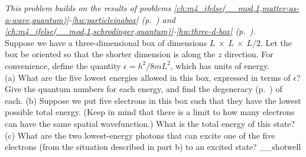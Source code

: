 \emph{This problem builds on the results of problems \ref{ch:m4_ifelse(__mod,1,matter-as-a-wave,quantum)}-\ref{hw:particleinabox}
(p.~\pageref{hw:particleinabox}) and \ref{ch:m4_ifelse(__mod,1,schrodinger,quantum)}-\ref{hw:three-d-box}
(p.~\pageref{hw:three-d-box}).}\\
Suppose we have a three-dimensional box of dimensions $L\ \times\ L\ \times\ L/2$.
Let the box be oriented so that the shorter dimension is along the $z$ direction.
For convenience, define the quantity $\epsilon=h^2/8mL^2$, which has units of energy.\\
(a) What are the five lowest energies allowed in this box, expressed in terms of
$\epsilon$? Give the quantum numbers for each energy,
and find the degeneracy (p.~\pageref{m4_ifelse(__mod,1,quantum-degeneracy,subsubsec:degeneracy)}) of each.\hwendpart
(b) Suppose we put five electrons in this box such that they have the lowest
possible total energy. (Keep in
mind that there is a limit to how many electrons can have the same spatial wavefunction.) What is the
total energy of this state?\answercheck\hwendpart
(c) What are the two lowest-energy photons that can excite one of the five electrons (from the situation
described in part b) to an excited state?\answercheck\hwendpart
__shotwell
